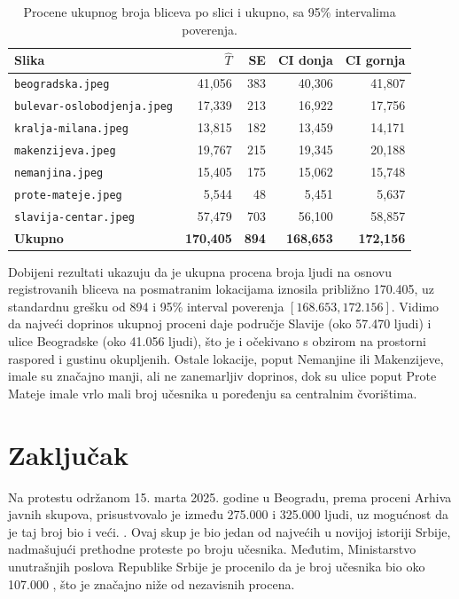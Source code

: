\documentclass[a4paper,12pt]{article}
\begin{document}
\begin{table}[H]
\centering
\begin{tabular}{lrrrr}
\hline
Slika & $\hat T$ & SE & CI donja & CI gornja \\
\hline
\texttt{beogradska.jpeg}          & 41,056  & 383 & 40,306  & 41,807  \\
\texttt{bulevar-oslobodjenja.jpeg}& 17,339  & 213 & 16,922  & 17,756  \\
\texttt{kralja-milana.jpeg}       & 13,815  & 182 & 13,459  & 14,171  \\
\texttt{makenzijeva.jpeg}         & 19,767  & 215 & 19,345  & 20,188  \\
\texttt{nemanjina.jpeg}           & 15,405  & 175 & 15,062  & 15,748  \\
\texttt{prote-mateje.jpeg}        & 5,544   & 48  & 5,451   & 5,637   \\
\texttt{slavija-centar.jpeg}      & 57,479  & 703 & 56,100  & 58,857  \\
\hline
\textbf{Ukupno}                   & \textbf{170,405} & \textbf{894} & \textbf{168,653} & \textbf{172,156} \\
\hline
\end{tabular}
\caption{Procene ukupnog broja bliceva po slici i ukupno, sa 95\% intervalima poverenja.}
\label{tab:results}
\end{table}

Dobijeni rezultati ukazuju da je ukupna procena broja ljudi na osnovu registrovanih bliceva na posmatranim lokacijama iznosila približno 170.405, uz standardnu grešku od 894 i 95\% interval poverenja $[168.653, 172.156]$. Vidimo da najveći doprinos ukupnoj proceni daje područje Slavije (oko 57.470 ljudi) i ulice Beogradske (oko 41.056 ljudi), što je i očekivano s obzirom na prostorni raspored i gustinu okupljenih. Ostale lokacije, poput Nemanjine ili Makenzijeve, imale su značajno manji, ali ne zanemarljiv doprinos, dok su ulice poput Prote Mateje imale vrlo mali broj učesnika u poređenju sa centralnim čvorištima.

\newpage
\section{Zaključak}
Na protestu održanom 15. marta 2025. godine u Beogradu, prema proceni Arhiva javnih skupova, prisustvovalo je između 275.000 i 325.000 ljudi, uz mogućnost da je taj broj bio i veći. \cite{n1protest15za15}
. Ovaj skup je bio jedan od najvećih u novijoj istoriji Srbije, nadmašujući prethodne proteste po broju učesnika. Međutim, Ministarstvo unutrašnjih poslova Republike Srbije je procenilo da je broj učesnika bio oko 107.000 \cite{insajder_mup_15za15}, što je značajno niže od nezavisnih procena.
\end{document}
